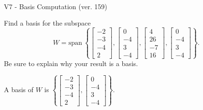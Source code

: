 \begin{exercise}
  \begin{exerciseTitle}V7 - Basis Computation (ver. 159)\end{exerciseTitle}
  \begin{exerciseStatement}
    Find a basis for the subspace 
\[W=\mathrm{span}\ \left\{\left[\begin{array}{r}
-2 \\
-3 \\
-4 \\
2
\end{array}\right] , \left[\begin{array}{r}
0 \\
-4 \\
3 \\
-4
\end{array}\right] , \left[\begin{array}{r}
4 \\
26 \\
-7 \\
16
\end{array}\right] , \left[\begin{array}{r}
0 \\
-4 \\
3 \\
-4
\end{array}\right]\right\}.\]
 Be sure to explain why your result is a basis.


  \end{exerciseStatement}
  \begin{exerciseAnswer}
   A basis of \(W\) is  \(\left\{\left[\begin{array}{r}
-2 \\
-3 \\
-4 \\
2
\end{array}\right] , \left[\begin{array}{r}
0 \\
-4 \\
3 \\
-4
\end{array}\right]\right\}\).
  


  \end{exerciseAnswer}
\end{exercise}